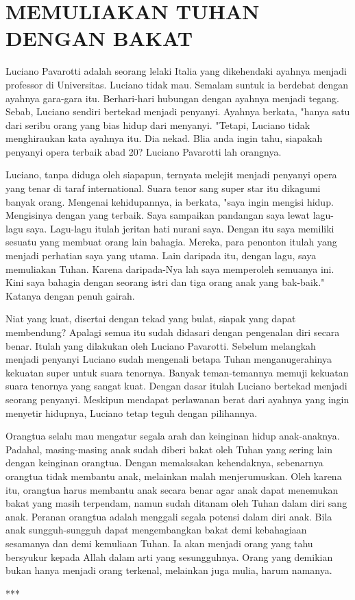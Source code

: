 \small
\newpage
\section*{\center MEMULIAKAN TUHAN DENGAN BAKAT}

	Luciano Pavarotti adalah seorang lelaki Italia yang dikehendaki ayahnya menjadi professor di Universitas. Luciano tidak mau. Semalam suntuk ia berdebat dengan ayahnya gara-gara itu. Berhari-hari hubungan dengan ayahnya menjadi tegang. Sebab, Luciano sendiri bertekad menjadi penyanyi. Ayahnya berkata, "hanya satu dari seribu orang yang bias hidup dari menyanyi. "Tetapi, Luciano tidak menghiraukan kata ayahnya itu. Dia nekad. Blia anda ingin tahu, siapakah penyanyi opera terbaik abad 20? Luciano Pavarotti lah orangnya.

	Luciano, tanpa diduga oleh siapapun, ternyata melejit menjadi penyanyi opera yang tenar di taraf international. Suara tenor sang super star itu dikagumi banyak orang. Mengenai kehidupannya, ia berkata, "saya ingin mengisi hidup. Mengisinya dengan yang terbaik. Saya sampaikan pandangan saya lewat lagu-lagu saya. Lagu-lagu itulah jeritan hati nurani saya. Dengan itu saya memiliki sesuatu yang membuat orang lain bahagia. Mereka, para penonton itulah yang menjadi perhatian saya yang utama. Lain daripada itu, dengan lagu, saya memuliakan Tuhan. Karena daripada-Nya lah saya memperoleh semuanya ini. Kini saya bahagia dengan seorang istri dan tiga orang anak yang bak-baik." Katanya dengan penuh gairah. 

	Niat yang kuat, disertai dengan tekad yang bulat, siapak yang dapat membendung? Apalagi semua itu sudah didasari dengan pengenalan diri secara benar. Itulah yang dilakukan oleh Luciano Pavarotti. Sebelum melangkah menjadi penyanyi Luciano sudah mengenali betapa Tuhan menganugerahinya kekuatan super untuk suara tenornya. Banyak teman-temannya memuji kekuatan suara tenornya yang sangat kuat. Dengan dasar itulah Luciano bertekad menjadi seorang penyanyi. Meskipun mendapat perlawanan berat dari ayahnya yang ingin menyetir hidupnya, Luciano tetap teguh dengan pilihannya.

	Orangtua selalu mau mengatur segala arah dan keinginan hidup anak-anaknya. Padahal, masing-masing anak sudah diberi bakat oleh Tuhan yang sering lain dengan keinginan orangtua. Dengan memaksakan kehendaknya, sebenarnya orangtua tidak membantu anak, melainkan malah menjerumuskan. Oleh karena itu, orangtua harus membantu anak secara benar agar anak dapat menemukan bakat yang masih terpendam, namun sudah ditanam oleh Tuhan dalam diri sang anak. Peranan orangtua adalah menggali segala potensi dalam diri  anak. Bila anak sungguh-sungguh dapat mengembangkan bakat demi kebahagiaan sesamanya dan demi kemuliaan Tuhan. Ia akan menjadi orang yang tahu bersyukur kepada Allah dalam arti yang sesungguhnya. Orang yang demikian bukan hanya menjadi orang terkenal, melainkan juga mulia, harum namanya.
\begin{center} ***\end{center}
\normalsize
